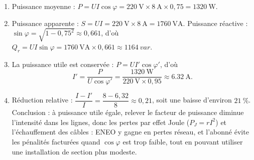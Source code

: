 \documentclass[11pt]{article}
\begin{document}
\begin{corrige}
\begin{enumerate}
\item Puissance moyenne : $P = UI\cos\varphi = \SI{220}{\volt} \times \SI{8}{\ampere} \times 0{,}75 = \SI{1320}{\watt}$.
\item Puissance apparente : $S = UI = \SI{220}{\volt} \times \SI{8}{\ampere} = \SI{1760}{\volt\ampere}$. Puissance réactive : $\sin\varphi = \sqrt{1 - 0{,}75^2} \approx 0{,}661$, d'où $Q_r = UI\sin\varphi = \SI{1760}{\volt\ampere} \times 0{,}661 \approx \SI{1164}{var}$.
\item La puissance utile est conservée : $P = UI'\cos\varphi'$, d'où
\[ I' = \dfrac{P}{U\cos\varphi'} = \dfrac{\SI{1320}{\watt}}{\SI{220}{\volt} \times 0{,}95} \approx \SI{6,32}{\ampere}. \]
\item Réduction relative : $\dfrac{I - I'}{I} = \dfrac{8 - 6{,}32}{8} \approx 0{,}21$, soit une baisse d'environ $21\ \%$. Conclusion : à puissance utile égale, relever le facteur de puissance diminue l'intensité dans les lignes, donc les pertes par effet Joule ($P_J = rI^2$) et l'échauffement des câbles : ENEO y gagne en pertes réseau, et l'abonné évite les pénalités facturées quand $\cos\varphi$ est trop faible, tout en pouvant utiliser une installation de section plus modeste.
\end{enumerate}
\end{corrige}
\end{document}

